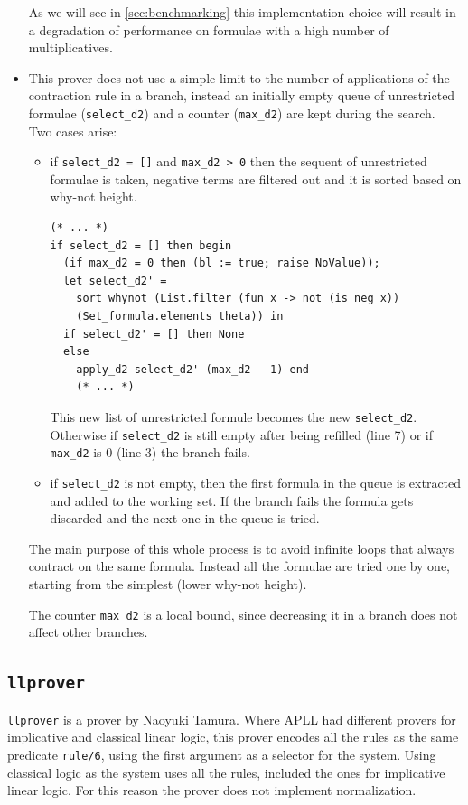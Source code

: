\documentclass[a4paper, 12pt, tesi, english]{report}
\begin{document}
\begin{itemize}
		As we will see in \ref{sec:benchmarking} this implementation choice will result in a degradation of performance on formulae with a high number of multiplicatives.
	\item This prover does not use a simple limit to the number of applications of the contraction rule in a branch, instead an initially empty queue of unrestricted formulae (\texttt{select\_d2}) and a counter (\texttt{max\_d2}) are kept during the search.
		Two cases arise:
		\begin{itemize}
			\item if \texttt{select\_d2 = []} and \texttt{max\_d2 > 0} then the sequent of unrestricted formulae is taken, negative terms are filtered out and it is sorted based on why-not height.	%
				\begin{lstlisting}[language=caml]
(* ... *)
if select_d2 = [] then begin
  (if max_d2 = 0 then (bl := true; raise NoValue));                    
  let select_d2' = 
    sort_whynot (List.filter (fun x -> not (is_neg x)) 
    (Set_formula.elements theta)) in
  if select_d2' = [] then None
  else
    apply_d2 select_d2' (max_d2 - 1) end
    (* ... *)
				\end{lstlisting}
				This new list of unrestricted formule becomes the new \texttt{select\_d2}.
				Otherwise if \texttt{select\_d2} is still empty after being refilled (line 7) or if \texttt{max\_d2} is 0 (line 3) the branch fails.
			\item if \texttt{select\_d2} is not empty, then the first formula in the queue is extracted and added to the working set.	%
				If the branch fails the formula gets discarded and the next one in the queue is tried.	%
		\end{itemize}
		The main purpose of this whole process is to avoid infinite loops that always contract on the same formula.
		Instead all the formulae are tried one by one, starting from the simplest (lower why-not height).

		The counter \texttt{max\_d2} is a local bound, since decreasing it in a branch does not affect other branches.
\end{itemize}

\subsection{\texttt{llprover}}
\texttt{llprover} is a prover by Naoyuki Tamura.
Where APLL had different provers for implicative and classical linear logic, this prover encodes all the rules as the same predicate \texttt{rule/6}, using the first argument as a selector for the system.
Using classical logic as the system uses all the rules, included the ones for implicative linear logic.
For this reason the prover does not implement normalization.
\end{document}
